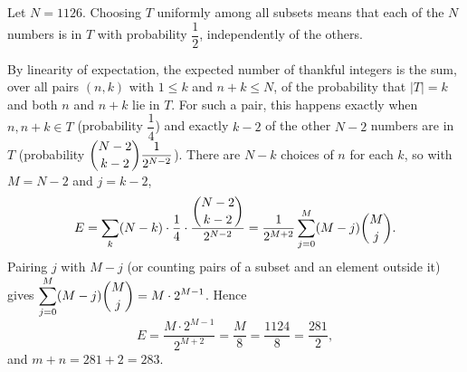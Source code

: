 Let $N=1126$. Choosing $T$ uniformly among all subsets means that each of the $N$ numbers is in $T$ with probability $\dfrac12$, independently of the others.

By linearity of expectation, the expected number of thankful integers is the sum, over all pairs $(n,k)$ with $1\le k$ and $n+k\le N$, of the probability that $|T|=k$ and both $n$ and $n+k$ lie in $T$. For such a pair, this happens exactly when $n,n+k\in T$ (probability $\dfrac14$) and exactly $k-2$ of the other $N-2$ numbers are in $T$ (probability $\dbinom{N-2}{k-2}\dfrac{1}{2^{N-2}}$). There are $N-k$ choices of $n$ for each $k$, so with $M=N-2$ and $j=k-2$,
\[E=\sum_{k}(N-k)\cdot\dfrac14\cdot\dfrac{\dbinom{N-2}{k-2}}{2^{N-2}}=\dfrac{1}{2^{M+2}}\sum_{j=0}^{M}(M-j)\dbinom Mj.\]
Pairing $j$ with $M-j$ (or counting pairs of a subset and an element outside it) gives $\displaystyle\sum_{j=0}^M(M-j)\dbinom Mj=M\cdot2^{M-1}$. Hence
\[E=\dfrac{M\cdot2^{M-1}}{2^{M+2}}=\dfrac M8=\dfrac{1124}{8}=\dfrac{281}{2},\]
and $m+n=281+2=\boxed{283}$.

